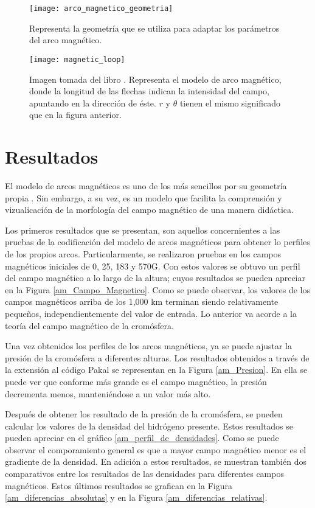 \begin{figure}[h]
\centering
\texttt{[image: arco\_magnetico\_geometria]}
\caption{ Representa la geometr\'ia que se utiliza para adaptar los par\'ametros del arco magn\'etico. }
\label{arco_geometria}
\end{figure}

\begin{figure}[h]
\centering
\texttt{[image: magnetic\_loop]}
\caption{ Imagen tomada del libro \citep{ashwanden}. Representa el modelo de arco magn\'etico, donde la longitud de las flechas indican la intensidad del campo, apuntando en la direcci\'on de \'este. $r$ y $\theta$ tienen el mismo significado que en la figura anterior.}
\label{arco_magnetico}
\end{figure}

\clearpage
\section{Resultados}

El modelo de arcos magn\'eticos es uno de los m\'as sencillos por su geometr\'ia propia . Sin embargo, a su vez, es un modelo que facilita la comprensi\'on y vizualicaci\'on de la morfolog\'ia del campo magn\'etico de una manera did\'actica.

Los primeros resultados que se presentan, son aquellos concernientes a las pruebas de la codificaci\'on del modelo de arcos magn\'eticos para obtener lo perfiles de los propios arcos. Particularmente, se realizaron pruebas en los campos magn\'eticos iniciales de 0, 25, 183 y 570G. Con estos valores se obtuvo un perfil del campo magn\'etico a lo largo de la altura; cuyos resultados se pueden apreciar en la Figura \ref{am_Campo_Magnetico}. Como se puede observar, los valores de los campos magn\'eticos arriba de los 1,000 km terminan siendo relativamente peque\~nos, independientemente del valor de entrada. Lo anterior va acorde a la teor\'ia del campo magn\'etico de la crom\'osfera.

Una vez obtenidos los perfiles de los arcos magn\'eticos, ya se puede ajustar la presi\'on de la crom\'osfera a diferentes alturas. Los resultados obtenidos a trav\'es de la extensi\'on al c\'odigo Pakal se representan en la Figura \ref{am_Presion}. En ella se puede ver que conforme m\'as grande es el campo magn\'etico, la presi\'on decrementa menos, manteni\'endose a un valor m\'as alto. 

Despu\'es de obtener los resultado de la presi\'on de la crom\'osfera, se pueden calcular los valores de la densidad del hidr\'ogeno presente. Estos resultados se pueden apreciar en el gr\'afico \ref{am_perfil_de_densidades}. Como se puede observar el comporamiento general es que a mayor campo magn\'etico menor es el gradiente de la densidad. En adici\'on a estos resultados, se muestran tambi\'en dos comparativos entre los resultados de las densidades para diferentes campos magn\'eticos. Estos \'ultimos resultados se grafican en la Figura \ref{am_diferencias_absolutas} y en la Figura \ref{am_diferencias_relativas}.

